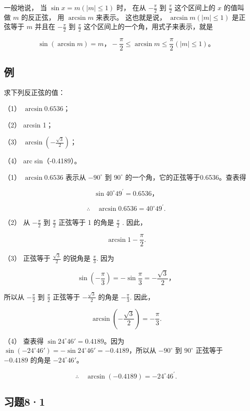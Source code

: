 一般地说， 当 \(\sin x = m(|m| \leqslant 1)\) 时， 在从
\(-\frac{\pi}{2}\) 到 \(\frac{\pi}{2}\) 这个区间上的 \(x\) 的值叫做
\(m\) 的反正弦， 用 \(\arcsin m\) 来表示。 这也就是说，
\(\arcsin m(|m| \leqslant 1)\) 是正弦等于 \(m\) 并且在
\(-\frac{\pi}{2}\) 到 \(\frac{\pi}{2}\)
这个区间上的一个角，用式子来表示，就是

\[
\sin (\arcsin m) = m\text{，} - \frac {\pi}{2} \leqslant \arcsin m \leqslant \frac {\pi}{2} (| m | \leqslant 1)\text{。}
\]

\subsection{例}

求下列反正弦的值：

（1） \(\arcsin 0.6536\)；

（2） arcsin 1；

（3） \(\arcsin\left(-\frac{\sqrt{3}}{2}\right)\)；

（4） arc sin（-0.4189）。

 （1） \(\arcsin 0.6536\) 表示从 \(-90^{\circ}\) 到
\(90^{\circ}\) 的一个角，它的正弦等于0.6536。查表得

\[
\sin 40 ^{\circ} 49 ^{\prime} = 0.6536\text{，}
\]

\[
\therefore \quad \arcsin 0.6536 = 40 ^{\circ} 49 ^{\prime}.
\]

（2） 从 \(-\frac{\pi}{2}\) 到 \(\frac{\pi}{2}\) 正弦等于 1 的角是
\(\frac{\pi}{2}\) . 因此，

\[
\arcsin 1 - \frac {\pi}{2}.
\]

（3） 正弦等于 \(\frac{\sqrt{3}}{2}\) 的锐角是 \(\frac{\pi}{3}\). 因为

\[
\sin \left(- \frac {\pi}{3}\right) = - \sin \frac {\pi}{3} = - \frac {\sqrt {3}}{2}\text{，}
\]

所以从 \(-\frac{\pi}{2}\) 到 \(\frac{\pi}{2}\) 正弦等于
\(-\frac{\sqrt{3}}{2}\) 的角是 \(-\frac{\pi}{3}\). 因此，

\[
\arcsin \left(- \frac {\sqrt {3}}{2}\right) = - \frac {\pi}{3}.
\]

（4） 查表得 \(\sin 24^{\circ}46' = 0.4189\)。因为
\(\sin (-24^{\circ}46') = -\sin 24^{\circ}46' = -0.4189\)，所以从
\(-90^{\circ}\) 到 \(90^{\circ}\) 正弦等于 \(-0.4189\) 的角是
\(-24^{\circ}46'\)。

\[
\therefore \quad \arcsin (- 0.4189) = - 24 ^{\circ} 46 ^{\prime}.
\]

\subsection{习题8·1}

